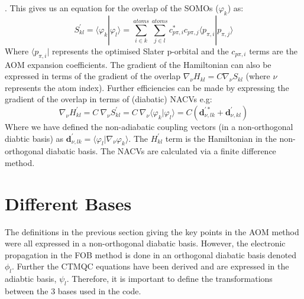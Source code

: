 \cite{spencer_fob-sh:_2016}. This gives us an equation for the overlap of the SOMOs ($\varphi_{k}$) as:
\begin{equation}
    S_{kl}^{'} = \langle \varphi_{k} | \varphi_{l} \rangle = \sum_{i \in k}^{atoms} \sum_{j \in l}^{atoms} c_{p\pi, i}^{*} c_{p\pi, j} \langle p_{\pi, i}|p_{\pi, j}\rangle
    \label{eq:P-orbital-overlap}
\end{equation}
Where $\langle p_{\pi, i} |$ represents the optimised Slater p-orbital and the $c_{p\pi, i}$ terms are the AOM expansion coefficients. The gradient of the Hamiltonian can also be expressed in terms of the gradient of the overlap $\nabla_{\nu} H_{kl} = C \nabla_{\nu} S_{kl}$ (where $\nu$ represents the atom index). Further efficiencies can be made by expressing the gradient of the overlap in terms of (diabatic) NACVs e.g:
\begin{equation}
  \nabla_{\nu} H_{kl}^{'} = C \ \nabla_{\nu} S_{kl}^{'} = C \ \nabla_{\nu} \langle \varphi_{k} | \varphi_{l} \rangle = C ( \textbf{d}_{\nu, lk}^{'*} + \textbf{d}_{\nu, kl}^{'} )
\end{equation}
Where we have defined the non-adiabatic coupling vectors (in a non-orthogonal diabtic basis) as $\textbf{d}^{'}_{\nu, lk} = \langle \varphi_{l}  | \nabla_{\nu} \varphi_{k}\rangle$. The $H^{'}_{kl}$ term is the Hamiltonian in the non-orthogonal diabatic basis. The NACVs are calculated via a finite difference method.

\section{Different Bases}
The definitions in the previous section giving the key points in the AOM method were all expressed in a non-orthogonal diabatic basis. However, the electronic propagation in the FOB method is done in an orthogonal diabatic basis denoted $\phi_{l}$. Further the CTMQC equations have been derived and are expressed in the adiabtic basis, $\psi_{l}$. Therefore, it is important to define the transformations between the 3 bases used in the code.
